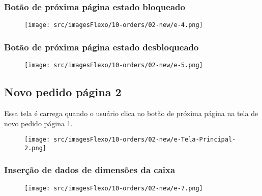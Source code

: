 \newpage
\thispagestyle{fancy}
\vspace*{40 pt}
\subsubsection{\small{Botão de próxima página estado bloqueado}}\label{telaNovoPedidoPagina1BotaoDeProximaPaginaEstadoBloqueado}
\vspace*{\fill}
\begin{figure}[h]
  \centering
  \texttt{[image: src/imagesFlexo/10-orders/02-new/e-4.png]}
\end{figure}
\vspace*{\fill}

\newpage
\thispagestyle{fancy}
\vspace*{40 pt}
\subsubsection{\small{Botão de próxima página estado desbloqueado}}\label{telaNovoPedidoPagina1BotaoDeProximaPaginaEstadoDesbloqueado}
\vspace*{\fill}
\begin{figure}[h]
  \centering
  \texttt{[image: src/imagesFlexo/10-orders/02-new/e-5.png]}
\end{figure}
\vspace*{\fill}

\newpage
\thispagestyle{fancy}
\vspace*{40 pt}
\subsection{Novo pedido página 2}\label{telaNovoPedidoPagina2}
Essa tela é carrega quando o usuário clica no botão de próxima página na tela de novo pedido página 1.
\vspace*{\fill}
\begin{figure}[h]
  \centering
  \texttt{[image: src/imagesFlexo/10-orders/02-new/e-Tela-Principal-2.png]}
\end{figure}

\newpage
\thispagestyle{fancy}
\vspace*{40 pt}
\subsubsection{\small{Inserção de dados de dimensões da caixa}}\label{telaNovoPedidoPagina2InsercaoDeDadosDeDimensoesDaCaixa}
\vspace*{\fill}
\begin{figure}[h]
  \centering
  \texttt{[image: src/imagesFlexo/10-orders/02-new/e-7.png]}
\end{figure}
\vspace*{\fill}

